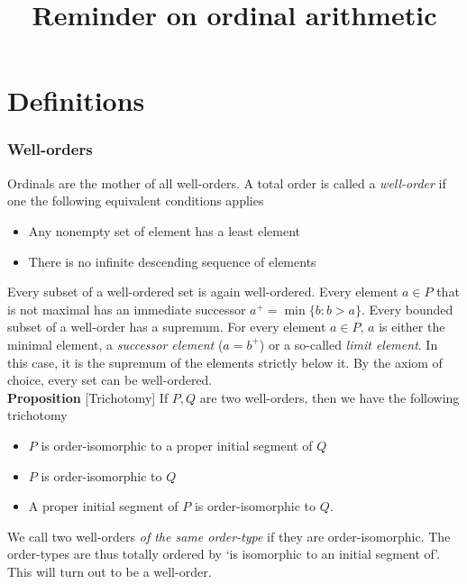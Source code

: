 

\title{Reminder on ordinal arithmetic}

\newcommand{\cf}{\mathrm{cf}}



\maketitle

\part{Definitions}
\section{Well-orders}
Ordinals are the mother of all well-orders. A total order is called a \emph{well-order} if one the following equivalent conditions applies
\begin{itemize}
	\item Any nonempty set of element has a least element
	\item There is no infinite descending sequence of elements
\end{itemize}
Every subset of a well-ordered set is again well-ordered. Every element $a \in P$ that is not maximal has an immediate successor $a^+ = \min \{ b : b > a \}$. Every bounded subset of a well-order has a supremum. For every element $a \in P$, $a$ is either the minimal element, a \emph{successor element} ($a = b^+$) or a so-called \emph{limit element}. In this case, it is the supremum of the elements strictly below it. By the axiom of choice, every set can be well-ordered. \\

\textbf{Proposition} [Trichotomy]
If $P,Q$ are two well-orders, then we have the following trichotomy
\begin{itemize}
	\item $P$ is order-isomorphic to a proper initial segment of $Q$
	\item $P$ is order-isomorphic to $Q$
	\item A proper initial segment of $P$ is order-isomorphic to $Q$.
\end{itemize}

We call two well-orders \emph{of the same order-type} if they are order-isomorphic. The order-types are thus totally ordered by `is isomorphic to an initial segment of'. This will turn out to be a well-order.


